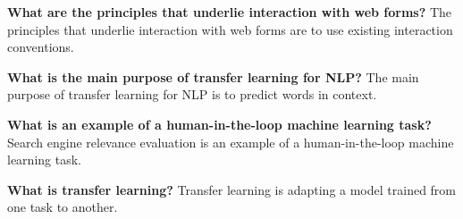 \documentclass[sigconf,nonacm,screen,pbalance]{acmart}
\begin{document}
{\bf What are the principles that underlie interaction with web forms?}
The
principles that underlie interaction with web forms are to use existing
interaction conventions.

{\bf What is the main purpose of transfer learning for NLP?}
The
main purpose of transfer learning for NLP is to predict words in
context.

{\bf What is an example of a human-in-the-loop machine learning task?}
Search
engine relevance evaluation is an example of a human-in-the-loop machine
learning task.

{\bf What is transfer learning?}
Transfer learning is adapting a model trained from one task to another.
\end{document}
